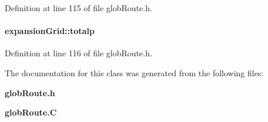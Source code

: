Definition at line 115 of file glob\-Route.h.\label{expansionGrid_o3}
\paragraph{ expansion\-Grid::totalp\hspace{0.3cm}{\tt  [private]}}\hfill



Definition at line 116 of file glob\-Route.h.

The documentation for this class was generated from the following files:\begin{CompactItemize}
\item 
{\bf glob\-Route.h}\item 
{\bf glob\-Route.C}\end{CompactItemize}
